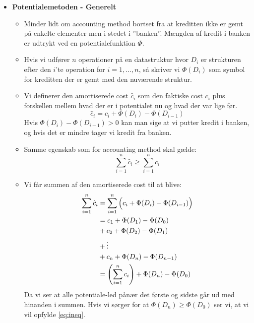 \begin{itemize}
\item \textbf{Potentialemetoden - Generelt}
\begin{itemize}
	\item Minder lidt om accounting method bortset fra at kreditten ikke er gemt på enkelte elementer men i stedet i ''banken''. Mængden af kredit i banken er udtrykt ved en potentialefunktion $\Phi$.
	\item Hvis vi udfører $n$ operationer på en datastruktur hvor $D_i$ er strukturen efter den $i$'te operation for $i = 1, ..., n$, så skriver vi $\Phi(D_i)$ som symbol for kreditten der er gemt med den nuværende struktur.
	\item Vi definerer den amortiserede cost $\hat c_i$ som den faktiske cost $c_i$ plus forskellen mellem hvad der er i potentialet nu og hvad der var lige før.
	$$
	\hat c_i = c_i + \Phi(D_i) - \Phi(D_{i-1})
	$$
	Hvis $\Phi(D_i) - \Phi(D_{i-1}) > 0$ kan man sige at vi putter kredit i banken, og hvis det er mindre tager vi kredit fra banken.
	\item Samme egenskab som for accounting method skal gælde:
	\begin{equation} \label{eq:ineq}
	\sum_{i=1}^n \hat c_i \geq \sum_{i=1}^n c_i
	\end{equation}
	\item Vi får summen af den amortiserede cost til at blive:
	\begin{align*}
	\sum_{i=1}^n \hat c_i &= \sum_{i=1}^n \Big(  c_i + \Phi(D_i) - \Phi(D_{i-1})  \Big)\\
	&= c_1 + \Phi(D_1) - \Phi(D_0)\\
	&+ c_2 + \Phi(D_2) - \Phi(D_1)\\
	&+ \vdots\\
	&+ c_n + \Phi(D_n) - \Phi(D_{n-1})\\
	&= \left(  \sum_{i=1}^n c_i  \right) + \Phi(D_n) - \Phi(D_0)
	\end{align*}
	Da vi ser at alle potentiale-led pånær det første og sidste går ud med hinanden i summen. Hvis vi sørger for at $\Phi(D_n) \geq \Phi(D_0)$ ser vi, at vi vil opfylde \cref{eq:ineq}.
\end{itemize}


\end{itemize}
